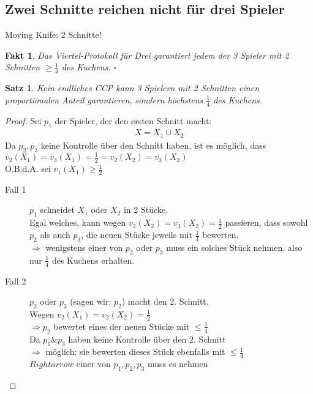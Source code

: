 \documentclass[a4paper,10pt]{scrartcl}
\newtheorem*{fakt}{Fakt}
\newtheorem*{satz*}{Satz}
\begin{document}
\subsection{Zwei Schnitte reichen nicht für drei Spieler}
Moving Knife: 2 Schnitte!
\begin{fakt}
 Das Viertel-Protokoll für Drei garantiert jedem der 3 Spieler mit 2 Schnitten $\geq\frac{1}{4}$ des Kuchens. $\square$
\end{fakt}
\begin{satz*}
 Kein endliches CCP kann 3 Spielern mit 2 Schnitten einen proportionalen Anteil garantieren, sondern höchstens $\frac{1}{4}$ des Kuchens.
\end{satz*}
\begin{proof}
 Sei $p_1$ der Spieler, der den ersten Schnitt macht:
 \begin{align*}X=X_1\cup X_2\end{align*}
 Da $p_2, p_3$ keine Kontrolle über den Schnitt haben, ist es möglich, dass $v_2(X_1)=v_3(X_1)=\frac{1}{2}=v_2(X_2)=v_3(X_2)$\\
 O.B.d.A. sei $v_1(X_1)\geq\frac{1}{2}$
 \begin{description}
  \item[Fall 1] $p_1$ schneidet $X_1$ oder $X_2$ in 2 Stücke.\\
                Egal welches, kann wegen $v_2(X_2)=v_3(X_2)=\frac{1}{2}$ passieren, dass sowohl $p_2$ als auch $p_3$, die neuen Stücke
                jeweils mit $\frac{1}{4}$ bewerten.\\
                $\Rightarrow$ wenigstens einer von $p_2$ oder $p_3$ muss ein solches Stück nehmen, also nur $\frac{1}{4}$ des Kuchens erhalten.
  \item[Fall 2] $p_2$ oder $p_3$ (sagen wir: $p_2$) macht den 2. Schnitt.\\
                Wegen $v_2(X_1)=v_2(X_2)=\frac{1}{2}$\\
                $\Rightarrow p_2$ bewertet eines der neuen Stücke mit $\leq\frac{1}{4}$\\
                Da $p_1 \& p_3$ haben keine Kontrolle über den 2. Schnitt\\
                $\Rightarrow$ möglich: sie bewerten dieses Stück ebenfalls mit $\leq\frac{1}{4}$\\
                $Rightarrow$ einer von $p_1,p_2,p_3$ muss es nehmen
 \end{description}
\end{proof}
\end{document}
